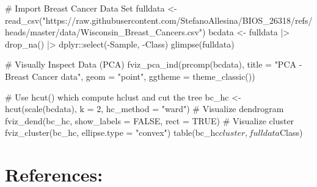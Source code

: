 \documentclass[
  letterpaper,
  DIV=11,
  numbers=noendperiod]{scrreprt}
\newenvironment{Shaded}{\begin{snugshade}}{\end{snugshade}}
\newcommand{\NormalTok}[1]{\textcolor[rgb]{0.00,0.23,0.31}{#1}}
\begin{document}
\begin{Shaded}
\begin{Highlighting}[]
\NormalTok{\# Import Breast Cancer Data Set}
\NormalTok{fulldata \textless{}{-} read\_csv("https://raw.githubusercontent.com/StefanoAllesina/BIOS\_26318/refs/heads/master/data/Wisconsin\_Breast\_Cancers.csv")}
\NormalTok{bcdata \textless{}{-} fulldata |\textgreater{} drop\_na() |\textgreater{} dplyr::select({-}Sample, {-}Class)}
\NormalTok{glimpse(fulldata)}
\end{Highlighting}
\end{Shaded}

\begin{Shaded}
\begin{Highlighting}[]
\NormalTok{\# Visually Inspect Data (PCA)}
\NormalTok{fviz\_pca\_ind(prcomp(bcdata), title = "PCA {-} Breast Cancer data", geom = "point", ggtheme = theme\_classic())}
\end{Highlighting}
\end{Shaded}

\begin{Shaded}
\end{Shaded}

\begin{Shaded}
\begin{Highlighting}[]
\NormalTok{\# Use hcut() which compute hclust and cut the tree}
\NormalTok{bc\_hc \textless{}{-} hcut(scale(bcdata), k = 2, hc\_method = "ward")}
\NormalTok{\# Visualize dendrogram}
\NormalTok{fviz\_dend(bc\_hc, show\_labels = FALSE, rect = TRUE)}
\NormalTok{\# Visualize cluster}
\NormalTok{fviz\_cluster(bc\_hc, ellipse.type = "convex")}
\NormalTok{table(bc\_hc$cluster, fulldata$Class)}
\end{Highlighting}
\end{Shaded}

\section{References:}\label{references-1}
\end{document}
